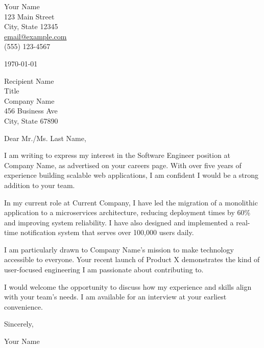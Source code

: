 \documentclass[11pt,a4paper]{article}
\begin{document}
\begin{flushright}
Your Name\\
123 Main Street\\
City, State 12345\\
\href{mailto:email@example.com}{email@example.com}\\
(555) 123-4567
\end{flushright}

\vspace{20pt}

\today

\vspace{20pt}

Recipient Name\\
Title\\
Company Name\\
456 Business Ave\\
City, State 67890

\vspace{20pt}

Dear Mr./Ms. Last Name,

I am writing to express my interest in the Software Engineer position at Company Name, as advertised on your careers page. With over five years of experience building scalable web applications, I am confident I would be a strong addition to your team.

In my current role at Current Company, I have led the migration of a monolithic application to a microservices architecture, reducing deployment times by 60\% and improving system reliability. I have also designed and implemented a real-time notification system that serves over 100,000 users daily.

I am particularly drawn to Company Name's mission to make technology accessible to everyone. Your recent launch of Product X demonstrates the kind of user-focused engineering I am passionate about contributing to.

I would welcome the opportunity to discuss how my experience and skills align with your team's needs. I am available for an interview at your earliest convenience.

\vspace{20pt}

Sincerely,

\vspace{40pt}

Your Name
\end{document}

